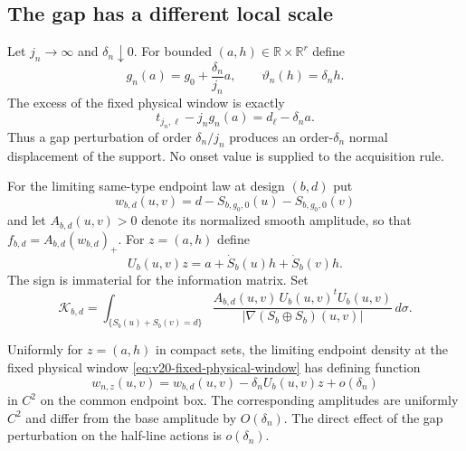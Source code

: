\subsection{The gap has a different local scale}

Let $j_n\to\infty$ and $\delta_n\downarrow0$.  For bounded
$(a,h)\in\mathbb R\times\mathbb R^r$ define
\begin{equation}\label{eq:v20-multirate-parameter}
 g_n(a)=g_0+\frac{\delta_n}{j_n}a,
 \qquad
 \vartheta_n(h)=\delta_nh.
\end{equation}
The excess of the fixed physical window is exactly
\begin{equation}\label{eq:v20-raw-excess}
 t_{j_n,\ell}-j_ng_n(a)=d_\ell-\delta_na.
\end{equation}
Thus a gap perturbation of order $\delta_n/j_n$ produces an order-$\delta_n$
normal displacement of the support.  No onset value is supplied to the
acquisition rule.

For the limiting same-type endpoint law at design $(b,d)$ put
\[
 w_{b,d}(u,v)=d-S_{b,g_0,0}(u)-S_{b,g_0,0}(v)
\]
and let $A_{b,d}(u,v)>0$ denote its normalized smooth amplitude, so that
$f_{b,d}=A_{b,d}(w_{b,d})_+$.  For $z=(a,h)$ define
\begin{equation}\label{eq:v20-raw-support-velocity}
 U_b(u,v)z=a+\dot S_b(u)h+\dot S_b(v)h.
\end{equation}
The sign is immaterial for the information matrix.  Set
\begin{equation}\label{eq:v20-raw-information}
 \mathcal K_{b,d}
 =\int_{\{S_b(u)+S_b(v)=d\}}
 \frac{A_{b,d}(u,v)\,U_b(u,v)^tU_b(u,v)}
      {|\nabla(S_b\oplus S_b)(u,v)|}\,d\sigma.
\end{equation}

\begin{lemma}
\label{lem:v20-fixed-window-reduction}
Uniformly for $z=(a,h)$ in compact sets, the limiting endpoint density at the
fixed physical window \eqref{eq:v20-fixed-physical-window} has defining
function
\begin{equation}\label{eq:v20-defining-expansion}
 w_{n,z}(u,v)=w_{b,d}(u,v)-\delta_nU_b(u,v)z+o(\delta_n)
\end{equation}
in $C^2$ on the common endpoint box.  The corresponding amplitudes are
uniformly $C^2$ and differ from the base amplitude by $O(\delta_n)$.  The
direct effect of the gap perturbation on the half-line actions is
$o(\delta_n)$.
\end{lemma}

